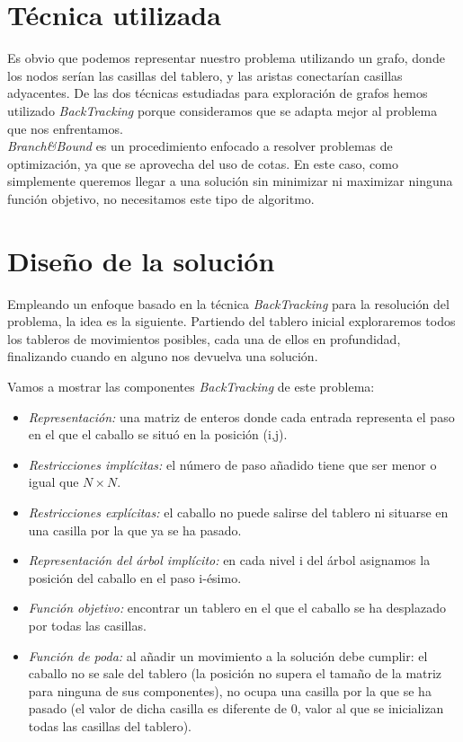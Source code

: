 \documentclass[11pt]{article}
\begin{document}
\section*{Técnica utilizada}

Es obvio que podemos representar nuestro problema utilizando un grafo, donde los nodos serían las casillas del tablero, y las aristas conectarían casillas adyacentes. De las dos técnicas estudiadas para exploración de grafos hemos utilizado \textit{BackTracking} porque consideramos que se adapta mejor al problema que nos enfrentamos.\\

\textit{Branch\&Bound} es un procedimiento enfocado a resolver problemas de optimización, ya que se aprovecha del uso de cotas. En este caso, como simplemente queremos llegar a una solución sin minimizar ni maximizar ninguna función objetivo, no necesitamos este tipo de algoritmo.


\section*{Diseño de la solución}

Empleando un enfoque basado en la técnica \textit{BackTracking} para la resolución del problema, la idea es la siguiente. Partiendo del tablero inicial exploraremos todos los tableros de movimientos posibles, cada una de ellos en profundidad, finalizando cuando en alguno nos devuelva una solución.

Vamos a mostrar las componentes \textit{BackTracking} de este problema:

\begin{itemize}
	\item \textit{Representación:} una matriz de enteros donde cada entrada representa el paso en el que el caballo se situó en la posición (i,j).
	\item \textit{Restricciones implícitas:} el número de paso añadido tiene que ser menor o igual que $N \times N$.
	\item \textit{Restricciones explícitas:} el caballo no puede salirse del tablero ni situarse en una casilla por la que ya se ha pasado.
	\item \textit{Representación del árbol implícito:} en cada nivel i del árbol asignamos la posición del caballo en el paso i-ésimo.
	\item \textit{Función objetivo:} encontrar un tablero en el que el caballo se ha desplazado por todas las casillas.
	\item \textit{Función de poda:} al añadir un movimiento a la solución debe cumplir: el caballo no se sale del tablero (la posición no supera el tamaño de la matriz para ninguna de sus componentes), no ocupa una casilla por la que se ha pasado (el valor de dicha casilla es diferente de 0, valor al que se inicializan todas las casillas del tablero).
\end{itemize}
\end{document}
